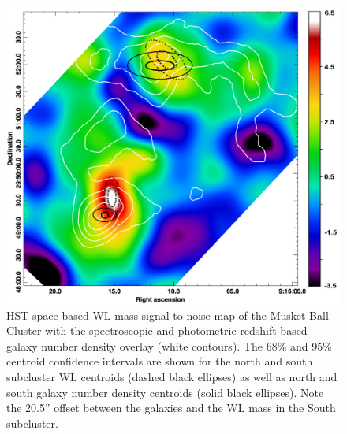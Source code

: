 \begin{figure}
\centering
\includegraphics[width=5in]{Chapter4/LensingGalaxyOverlay.png}
\caption[Musket Ball Cluster weak lensing signal-to-noise map with galaxy number density map overlay, including centroid locations.]{
HST space-based WL mass signal-to-noise map of the Musket Ball Cluster with the spectroscopic and photometric redshift based galaxy number density overlay (white contours).
The 68\% and 95\% centroid confidence intervals are shown for the north and south subcluster WL centroids (dashed black ellipses) as well as north and south galaxy number density centroids (solid black ellipses).
Note the 20.5'' offset between the galaxies and the WL mass in the South subcluster.
}
\label{figure:LensingGalaxyOverlay}
\end{figure}



